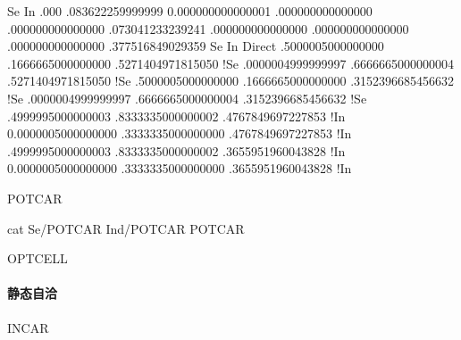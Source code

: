 \documentclass[a4paper,12pt,english]{sphinxmanual}
\begin{document}
\begin{sphinxVerbatim}[commandchars=\\\{\}]
  Se   In
  .000
       .083622259999999      \PYGZhy{}0.000000000000001       .000000000000000
       .000000000000000       .073041233239241       .000000000000000
       .000000000000000       .000000000000000      .377516849029359
  Se   In
     
Direct
  .5000005000000000   .1666665000000000   .5271404971815050   !Se
  .0000004999999997   .6666665000000004   .5271404971815050   !Se
  .5000005000000000   .1666665000000000   .3152396685456632   !Se
  .0000004999999997   .6666665000000004   .3152396685456632   !Se
  .4999995000000003   .8333335000000002   .4767849697227853   !In
 \PYGZhy{}0.0000005000000000   .3333335000000000   .4767849697227853   !In
  .4999995000000003   .8333335000000002   .3655951960043828   !In
 \PYGZhy{}0.0000005000000000   .3333335000000000   .3655951960043828   !In
\end{sphinxVerbatim}

\begin{DUlineblock}{0em}
\item[] POTCAR
\end{DUlineblock}

\begin{sphinxVerbatim}[commandchars=\\\{\}]
cat Se/POTCAR In\PYGZus{}d/POTCAR \PYGZgt{} POTCAR
\end{sphinxVerbatim}

\begin{DUlineblock}{0em}
\item[] OPTCELL
\end{DUlineblock}

\begin{sphinxVerbatim}[commandchars=\\\{\}]
\end{sphinxVerbatim}


\paragraph{静态自洽}
\label{\detokenize{tutorials/vasp/mobility:id8}}
\begin{DUlineblock}{0em}
\item[] INCAR
\end{DUlineblock}
\end{document}

